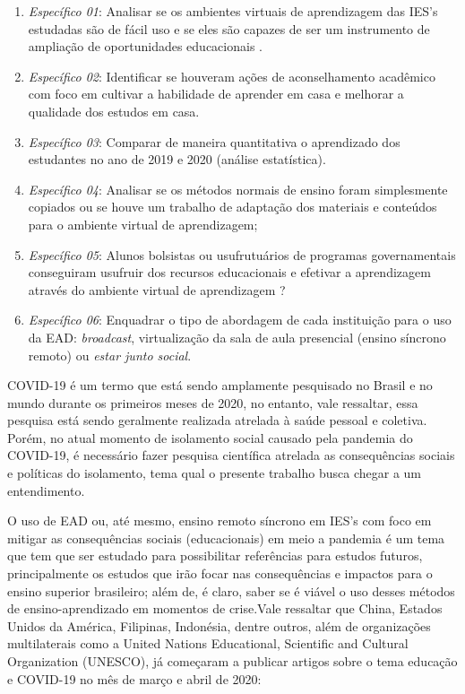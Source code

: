 \documentclass[
	arial,
	12pt,				%
	openright,			%
	oneside,
	a4paper,			%
	chapter=TITLE,		%
	english,			%
	french,				%
	spanish,			%
	brazil,				%
	]{abntex2}
\begin{document}
\begin{enumerate}
  \item \label{obj-esp1} \textit{Específico 01}: Analisar se os ambientes virtuais de aprendizagem das IES's estudadas são de fácil uso e se eles são capazes de ser um instrumento de ampliação de oportunidades educacionais \cite{elielCruz}.
  \item \label{obj-esp2} \textit{Específico 02}: Identificar se houveram ações de aconselhamento acadêmico com foco em cultivar a habilidade de aprender em casa e melhorar a qualidade dos estudos em casa.
  \item \label{obj-esp3} \textit{Específico 03}: Comparar de maneira quantitativa o aprendizado dos estudantes no ano de 2019 e 2020 (análise estatística).
  \item \label{obj-esp4} \textit{Específico 04}: Analisar se os métodos normais de ensino foram simplesmente copiados ou se houve um trabalho de adaptação dos materiais e conteúdos para o ambiente virtual de aprendizagem;
  \item \label{obj-esp5} \textit{Específico 05}: Alunos bolsistas ou usufrutuários de programas governamentais conseguiram usufruir dos recursos educacionais e efetivar a aprendizagem através do ambiente virtual de aprendizagem ?
  \item \label{obj-esp6} \textit{Específico 06}: Enquadrar o tipo de abordagem de cada instituição para o uso da EAD: \textit{broadcast}, virtualização da sala de aula presencial (ensino síncrono remoto) ou \textit{estar junto social}.

\end{enumerate}

COVID-19 é um termo que está sendo amplamente pesquisado no Brasil e no mundo \cite{googleTrends} durante os primeiros meses de 2020, no entanto, vale ressaltar, essa pesquisa está sendo geralmente realizada atrelada à saúde pessoal e coletiva. Porém, no atual momento de isolamento social causado pela pandemia do COVID-19, é necessário fazer pesquisa científica atrelada as consequências sociais e políticas do isolamento, tema qual o presente trabalho busca chegar a um entendimento. 

O uso de EAD ou, até mesmo, ensino remoto síncrono em IES's com foco em mitigar as consequências sociais (educacionais) em meio a pandemia é um tema que tem que ser estudado para possibilitar referências para estudos futuros, principalmente os estudos que irão focar nas consequências e impactos para o ensino superior  brasileiro; além de, é claro, saber se é viável o uso desses métodos de ensino-aprendizado  em momentos de crise.Vale ressaltar que China, Estados Unidos da América, Filipinas, Indonésia, dentre outros, além de organizações multilaterais como a United Nations Educational, Scientific and Cultural Organization (UNESCO), já começaram a publicar artigos sobre o tema educação e COVID-19 no mês de março e abril de 2020:
\end{document}
